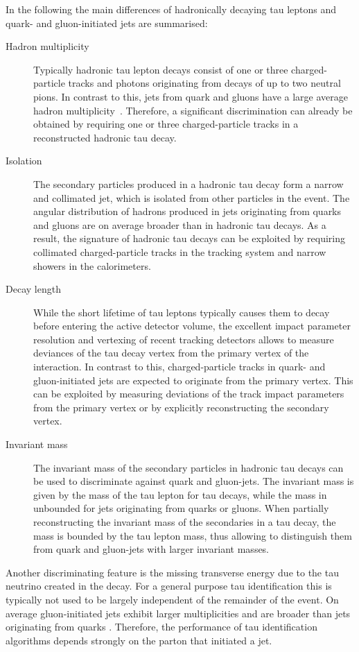 In the following the main differences of hadronically decaying tau leptons and
quark- and gluon-initiated jets are summarised:
\begin{description}
\item[Hadron multiplicity] Typically hadronic tau lepton decays consist of one
  or three charged-particle tracks and photons originating from decays of up to
  two neutral pions. In contrast to this, jets from quark and gluons have a
  large average hadron multiplicity~\cite{ellis_stirling_webber}. Therefore, a
  significant discrimination can already be obtained by requiring one or three
  charged-particle tracks in a reconstructed hadronic tau decay.

\item[Isolation] The secondary particles produced in a hadronic tau decay form a
  narrow and collimated jet, which is isolated from other particles in the
  event. The angular distribution of hadrons produced in jets originating from
  quarks and gluons are on average broader than in hadronic tau decays. As a
  result, the signature of hadronic tau decays can be exploited by requiring
  collimated charged-particle tracks in the tracking system and narrow showers
  in the calorimeters.

\item[Decay length] While the short lifetime of tau leptons typically causes
  them to decay before entering the active detector volume, the excellent impact
  parameter resolution and vertexing of recent tracking detectors allows to
  measure deviances of the tau decay vertex from the primary vertex of the
  interaction. In contrast to this, charged-particle tracks in quark- and
  gluon-initiated jets are expected to originate from the primary vertex. This
  can be exploited by measuring deviations of the track impact parameters from
  the primary vertex or by explicitly reconstructing the secondary vertex.

\item[Invariant mass] The invariant mass of the secondary particles in hadronic
  tau decays can be used to discriminate against quark and gluon-jets. The
  invariant mass is given by the mass of the tau lepton for tau decays, while
  the mass in unbounded for jets originating from quarks or gluons. When
  partially reconstructing the invariant mass of the secondaries in a tau decay,
  the mass is bounded by the tau lepton mass, thus allowing to distinguish them
  from quark and gluon-jets with larger invariant masses.

\end{description}
Another discriminating feature is the missing transverse energy due to the tau
neutrino created in the decay. For a general purpose tau identification this is
typically not used to be largely independent of the remainder of the event. On
average gluon-initiated jets exhibit larger multiplicities and are broader than
jets originating from quarks \cite{ellis_stirling_webber}. Therefore, the
performance of tau identification algorithms depends strongly on the parton that
initiated a jet.


